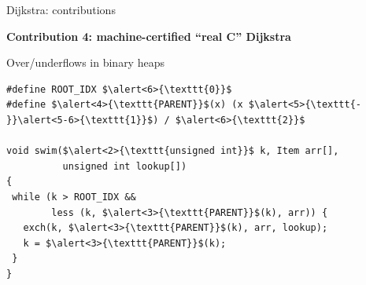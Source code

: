 \documentclass[usenames, xcolor=dvipsnames]{beamer}
\newcommand{\p}[1]{\ensuremath{\mathsf{#1}}} %
\begin{document}
\begin{frame}{Dijkstra: contributions}

{\textbf{Contribution 4: machine-certified ``real C'' Dijkstra}}

\bigskip


\bigskip







\bigskip


\end{frame}

\begin{frame}[fragile]{Over/underflows in binary heaps}

\begin{lstlisting}
#define ROOT_IDX $\alert<6>{\texttt{0}}$
#define $\alert<4>{\texttt{PARENT}}$(x) (x $\alert<5>{\texttt{- }}\alert<5-6>{\texttt{1}}$) / $\alert<6>{\texttt{2}}$

void swim($\alert<2>{\texttt{unsigned int}}$ k, Item arr[], 
          unsigned int lookup[])
{
 while (k > ROOT_IDX && 
        less (k, $\alert<3>{\texttt{PARENT}}$(k), arr)) {
   exch(k, $\alert<3>{\texttt{PARENT}}$(k), arr, lookup);
   k = $\alert<3>{\texttt{PARENT}}$(k); 
 }
}
\end{lstlisting}

\end{frame}
\end{document}
